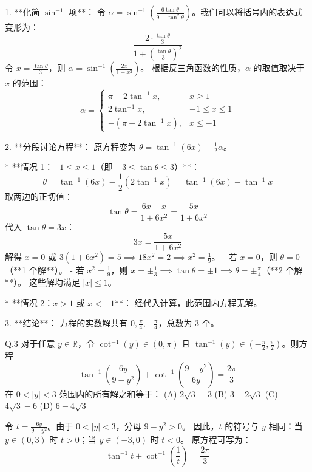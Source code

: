 \begin{questions}
\begin{solution}
    1. **化简 $\sin^{-1}$ 项**：
    令 $\alpha = \sin^{-1}\left( \frac{6\tan\theta}{9 + \tan^2\theta} \right)$。我们可以将括号内的表达式变形为：
    \[ \frac{2 \cdot \frac{\tan\theta}{3}}{1 + \left(\frac{\tan\theta}{3}\right)^2} \]
    令 $x = \frac{\tan\theta}{3}$，则 $\alpha = \sin^{-1}\left( \frac{2x}{1 + x^2} \right)$。
    根据反三角函数的性质，$\alpha$ 的取值取决于 $x$ 的范围：
    \[
    \alpha = 
    \begin{cases} 
    \pi - 2\tan^{-1}x, & x \ge 1 \\
    2\tan^{-1}x, & -1 \le x \le 1 \\
    -(\pi + 2\tan^{-1}x), & x \le -1
    \end{cases}
    \]

    2. **分段讨论方程**：
    原方程变为 $\theta = \tan^{-1}(6x) - \frac{1}{2}\alpha$。
    
    * **情况 1：$-1 \le x \le 1$（即 $-3 \le \tan\theta \le 3$）**：
        \[ \theta = \tan^{-1}(6x) - \frac{1}{2}(2\tan^{-1}x) = \tan^{-1}(6x) - \tan^{-1}x \]
        取两边的正切值：
        \[ \tan\theta = \frac{6x - x}{1 + 6x^2} = \frac{5x}{1 + 6x^2} \]
        代入 $\tan\theta = 3x$：
        \[ 3x = \frac{5x}{1 + 6x^2} \]
        解得 $x = 0$ 或 $3(1 + 6x^2) = 5 \implies 18x^2 = 2 \implies x^2 = \frac{1}{9}$。
        - 若 $x = 0$，则 $\theta = 0$（**1 个解**）。
        - 若 $x^2 = \frac{1}{9}$，则 $x = \pm \frac{1}{3} \implies \tan\theta = \pm 1 \implies \theta = \pm \frac{\pi}{4}$（**2 个解**）。
        这些解均满足 $|x| \le 1$。

    * **情况 2：$x > 1$ 或 $x < -1$**：
        经代入计算，此范围内方程无解。

    3. **结论**：
    方程的实数解共有 $0, \frac{\pi}{4}, -\frac{\pi}{4}$，总数为 3 个。
\end{solution}

\question
Q.3 对于任意 $y \in \mathbb{R}$，令 $\cot^{-1}(y) \in (0, \pi)$ 且 $\tan^{-1}(y) \in \left( -\frac{\pi}{2}, \frac{\pi}{2} \right)$。则方程
\[
\tan^{-1}\left( \frac{6y}{9-y^2} \right) + \cot^{-1}\left( \frac{9-y^2}{6y} \right) = \frac{2\pi}{3}
\]
在 $0 < |y| < 3$ 范围内的所有解之和等于：
(A) $2\sqrt{3}-3$ \quad (B) $3-2\sqrt{3}$ \quad (C) $4\sqrt{3}-6$ \quad (D) $6-4\sqrt{3}$

\begin{solution}
令 $t = \frac{6y}{9-y^2}$。由于 $0 < |y| < 3$，分母 $9-y^2 > 0$。
因此，$t$ 的符号与 $y$ 相同：当 $y \in (0, 3)$ 时 $t > 0$；当 $y \in (-3, 0)$ 时 $t < 0$。
原方程可写为：
\[
\tan^{-1} t + \cot^{-1} \left( \frac{1}{t} \right) = \frac{2\pi}{3}
\]


\end{solution}
\end{questions}
